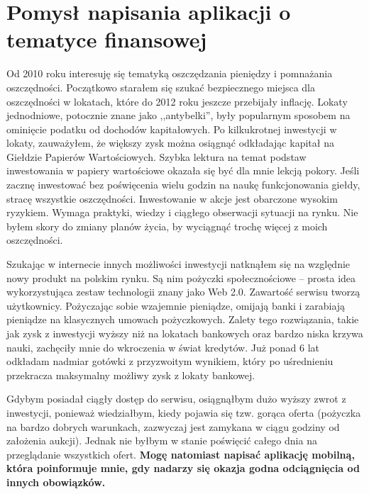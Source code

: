 \documentclass[a4paper,twoside,titlepage,openright]{book}
\begin{document}
\section*{Pomysł napisania aplikacji o tematyce finansowej}

Od 2010 roku interesuję się tematyką oszczędzania pieniędzy i pomnażania oszczędności. Początkowo starałem się szukać bezpiecznego miejsca dla oszczędności w lokatach, które do 2012 roku jeszcze przebijały inflację. Lokaty jednodniowe, potocznie znane jako ,,antybelki'', były popularnym sposobem na ominięcie podatku od dochodów kapitałowych. Po kilkukrotnej inwestycji w lokaty, zauważyłem, że większy zysk można osiągnąć odkładając kapitał na Giełdzie Papierów Wartościowych. Szybka lektura na temat podstaw inwestowania w papiery wartościowe okazała się być dla mnie lekcją pokory. Jeśli zacznę inwestować bez poświęcenia wielu godzin na naukę funkcjonowania giełdy, stracę wszystkie oszczędności. Inwestowanie w akcje jest obarczone wysokim ryzykiem. Wymaga praktyki, wiedzy i ciągłego obserwacji sytuacji na rynku. Nie byłem skory do zmiany planów życia, by wyciągnąć trochę więcej z moich oszczędności. 

Szukając w internecie innych możliwości inwestycji natknąłem się na względnie nowy produkt na polskim rynku. Są nim pożyczki społecznościowe -- prosta idea wykorzystująca zestaw technologii znany jako Web 2.0. Zawartość serwisu tworzą użytkownicy. Pożyczając sobie wzajemnie pieniądze, omijają banki i zarabiają pieniądze na klasycznych umowach pożyczkowych. Zalety tego rozwiązania, takie jak zysk z inwestycji wyższy niż na lokatach bankowych oraz bardzo niska krzywa nauki, zachęciły mnie do wkroczenia w świat kredytów. Już ponad 6 lat odkładam nadmiar gotówki z przyzwoitym wynikiem, który po uśrednieniu przekracza maksymalny możliwy zysk z lokaty bankowej. 

Gdybym posiadał ciągły dostęp do serwisu, osiągnąłbym dużo wyższy zwrot z inwestycji, ponieważ wiedziałbym, kiedy pojawia się tzw. gorąca oferta (pożyczka na bardzo dobrych warunkach, zazwyczaj jest zamykana w ciągu godziny od założenia aukcji). Jednak nie byłbym w stanie poświęcić całego dnia na przeglądanie wszystkich ofert. \textbf{Mogę natomiast napisać aplikację mobilną, która poinformuje mnie, gdy nadarzy się okazja godna odciągnięcia od innych obowiązków.} 
\end{document}
